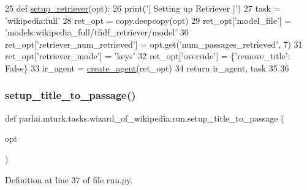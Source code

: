 \begin{DoxyCode}
25 \textcolor{keyword}{def }\hyperlink{namespaceparlai_1_1mturk_1_1tasks_1_1wizard__of__wikipedia_1_1run_a22eb017ecd8f1a211fc5aac511d3102e}{setup\_retriever}(opt):
26     print(\textcolor{stringliteral}{'[ Setting up Retriever ]'})
27     task = \textcolor{stringliteral}{'wikipedia:full'}
28     ret\_opt = copy.deepcopy(opt)
29     ret\_opt[\textcolor{stringliteral}{'model\_file'}] = \textcolor{stringliteral}{'models:wikipedia\_full/tfidf\_retriever/model'}
30     ret\_opt[\textcolor{stringliteral}{'retriever\_num\_retrieved'}] = opt.get(\textcolor{stringliteral}{'num\_passages\_retrieved'}, 7)
31     ret\_opt[\textcolor{stringliteral}{'retriever\_mode'}] = \textcolor{stringliteral}{'keys'}
32     ret\_opt[\textcolor{stringliteral}{'override'}] = \{\textcolor{stringliteral}{'remove\_title'}: \textcolor{keyword}{False}\}
33     ir\_agent = \hyperlink{namespaceparlai_1_1core_1_1agents_ad0d54074d4bcc148bb415ab5515a53b5}{create\_agent}(ret\_opt)
34     \textcolor{keywordflow}{return} ir\_agent, task
35 
36 
\end{DoxyCode}
\mbox{\label{namespaceparlai_1_1mturk_1_1tasks_1_1wizard__of__wikipedia_1_1run_a59836c3be93d4b491fa9ddecbb4e83c0}} 
\subsubsection{\texorpdfstring{setup\+\_\+title\+\_\+to\+\_\+passage()}{setup\_title\_to\_passage()}}
{\footnotesize\ttfamily def parlai.\+mturk.\+tasks.\+wizard\+\_\+of\+\_\+wikipedia.\+run.\+setup\+\_\+title\+\_\+to\+\_\+passage (\begin{DoxyParamCaption}\item[{}]{opt }\end{DoxyParamCaption})}



Definition at line 37 of file run.\+py.


